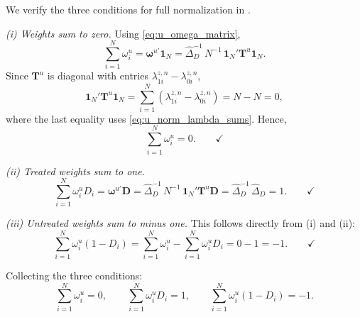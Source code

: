 \documentclass[12pt, a4paper, oneside]{article}
\theoremstyle{plain}
\theoremstyle{definition}
\begin{document}
We verify the three conditions for full normalization in \citet{knaus2024treatment}.

\smallskip
\noindent\textit{(i) Weights sum to zero.}
Using \eqref{eq:u_omega_matrix},
\begin{equation}
  \sum_{i=1}^{N} \omega_i^u
  = \boldsymbol{\omega}^{u\prime}\mathbf{1}_N
  = \widehat\Delta_D^{-1}\,N^{-1}\,\mathbf{1}_N'\mathbf{T}^u\mathbf{1}_N.
  \label{eq:u_sum_start}
\end{equation}
Since $\mathbf{T}^u$ is diagonal with entries
$\lambda_{1i}^{z,n} - \lambda_{0i}^{z,n}$,
\begin{equation}
  \mathbf{1}_N'\mathbf{T}^u\mathbf{1}_N
  = \sum_{i=1}^{N}\left(\lambda_{1i}^{z,n} - \lambda_{0i}^{z,n}\right)
  = N - N = 0,
  \label{eq:u_T_ones_zero}
\end{equation}
where the last equality uses \eqref{eq:u_norm_lambda_sums}. Hence,
\begin{equation}
  \sum_{i=1}^{N} \omega_i^u = 0. \qquad\checkmark
  \label{eq:u_sum_zero}
\end{equation}

\smallskip
\noindent\textit{(ii) Treated weights sum to one.}
\begin{equation}
  \sum_{i=1}^{N} \omega_i^u D_i
  = \boldsymbol{\omega}^{u\prime}\mathbf{D}
  = \widehat\Delta_D^{-1}\,N^{-1}\,\mathbf{1}_N'\mathbf{T}^u\mathbf{D}
  = \widehat\Delta_D^{-1}\,\widehat\Delta_D
  = 1. \qquad\checkmark
  \label{eq:u_treated_sum_one}
\end{equation}

\smallskip
\noindent\textit{(iii) Untreated weights sum to minus one.}
This follows directly from (i) and (ii):
\begin{equation}
  \sum_{i=1}^{N} \omega_i^u(1-D_i)
  = \sum_{i=1}^{N} \omega_i^u - \sum_{i=1}^{N} \omega_i^u D_i
  = 0 - 1
  = -1. \qquad\checkmark
  \label{eq:u_untreated_sum}
\end{equation}

\medskip
Collecting the three conditions:
\begin{equation}
  \sum_{i=1}^{N} \omega_i^u = 0,
  \qquad
  \sum_{i=1}^{N} \omega_i^u D_i = 1,
  \qquad
  \sum_{i=1}^{N} \omega_i^u(1-D_i) = -1.
  \label{eq:u_full_normalization}
\end{equation}
\end{document}
